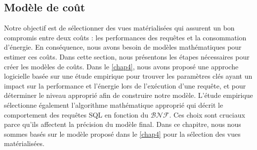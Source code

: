 \subsection{Modèle de coût}
Notre objectif est de sélectionner des vues matérialisées qui assurent un bon compromis entre deux coûts : les performances des requêtes et la consommation d'énergie. En conséquence, nous avons besoin de modèles mathématiques pour estimer ces coûts. Dans cette section, nous présentons les étapes nécessaires pour créer les modèles de coûts. Dans le \ref{chap4}, nous avons proposé une approche logicielle basée sur une étude empirique pour trouver les paramètres clés ayant un impact sur la performance et l'énergie lors de l'exécution d'une requête, et pour déterminer le niveau approprié afin de construire notre modèle. L'étude empirique sélectionne également l'algorithme mathématique approprié qui décrit le comportement des requêtes SQL en fonction du $\mathcal{BNF}$. Ces choix sont cruciaux parce qu'ils affectent la précision du modèle final.
Dans ce chapitre, nous nous sommes basés sur le modèle proposé dans le \ref{chap4} pour la sélection des vues matérialisées.


